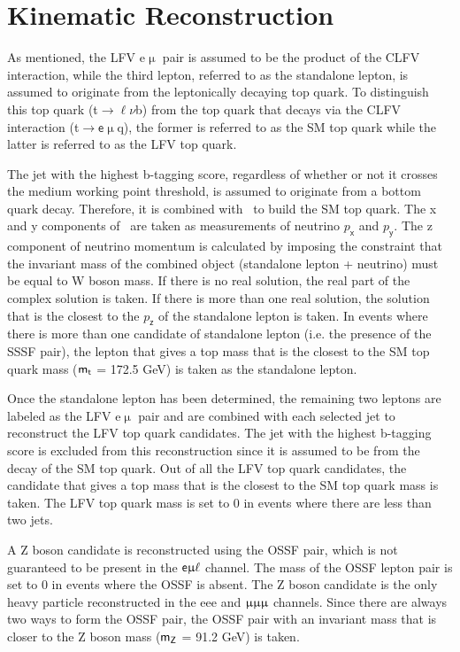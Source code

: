 \section{Kinematic Reconstruction}
\label{sec:Kin}

As mentioned, the LFV e$\upmu$ pair is assumed to be the product of the \ac{CLFV} interaction, while the third lepton, referred to as the standalone lepton, is assumed to originate from the leptonically decaying top quark. To distinguish this top quark (t$\rightarrow\ell\nu$b) from the top quark that decays via the \ac{CLFV} interaction (t$\rightarrow\textsf{e}\upmu$q), the former is referred to as the \ac{SM} top quark while the latter is referred to as the LFV top quark. 

The jet with the highest b-tagging score, regardless of whether or not it crosses the medium working point threshold, is assumed to originate from a bottom quark decay. Therefore, it is combined with \MET~to build the \ac{SM} top quark. The x and y components of \MET~are taken as measurements of neutrino $p_{\textsf{x}}$ and $p_{\textsf{y}}$. The z component of neutrino momentum is calculated by imposing the constraint that the invariant mass of the combined object (standalone lepton + neutrino) must be equal to W boson mass. If there is no real solution, the real part of the complex solution is taken. If there is more than one real solution, the solution that is the closest to the $p_{\textsf{z}}$ of the standalone lepton is taken. In events where there is more than one candidate of standalone lepton (i.e. the presence of the \ac{SSSF} pair), the lepton that gives a top mass that is the closest to the \ac{SM} top quark mass ($\textsf{m}_{\textsf{t}}$ = 172.5 GeV) is taken as the standalone lepton.

Once the standalone lepton has been determined, the remaining two leptons are labeled as the LFV e$\upmu$ pair and are combined with each selected jet to reconstruct the LFV top quark candidates. The jet with the highest b-tagging score is excluded from this reconstruction since it is assumed to be from the decay of the \ac{SM} top quark. Out of all the LFV top quark candidates, the candidate that gives a top mass that is the closest to the \ac{SM} top quark mass is taken. The LFV top quark mass is set to 0 in events where there are less than two jets.

A Z boson candidate is reconstructed using the \ac{OSSF} pair, which is not guaranteed to be present in the $\textsf{e}\upmu\ell$ channel. The mass of the \ac{OSSF} lepton pair is set to 0 in events where the \ac{OSSF} is absent. The Z boson candidate is the only heavy particle reconstructed in the eee and $\upmu\upmu\upmu$ channels. Since there are always two ways to form the \ac{OSSF} pair, the \ac{OSSF} pair with an invariant mass that is closer to the Z boson mass ($\textsf{m}_{\textsf{Z}}$ = 91.2 GeV) is taken. 

